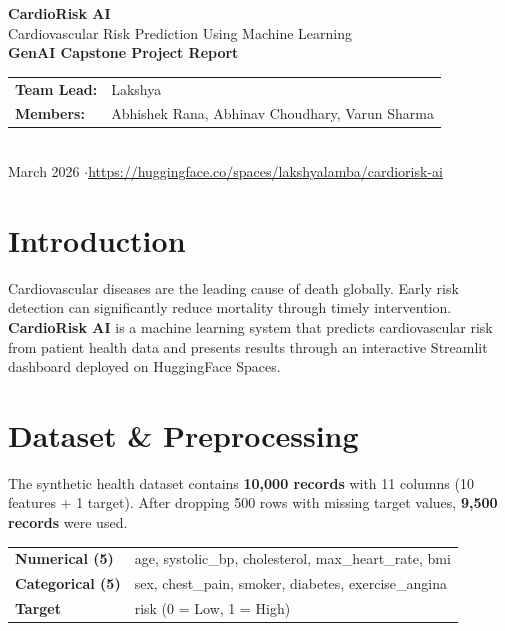 \documentclass[12pt, a4paper]{article}
\begin{document}
\begin{center}
    {\LARGE\bfseries\color{primary} CardioRisk AI}\\[4pt]
    {\large Cardiovascular Risk Prediction Using Machine Learning}\\[12pt]
    \textbf{GenAI Capstone Project Report}\\[16pt]
    \begin{tabular}{ll}
        \textbf{Team Lead:} & Lakshya \\
        \textbf{Members:}   & Abhishek Rana, Abhinav Choudhary, Varun Sharma \\
    \end{tabular}\\[8pt]
    {\color{graytext} March 2026 \quad$\cdot$\quad \url{https://huggingface.co/spaces/lakshyalamba/cardiorisk-ai}}
\end{center}

\vspace{6pt}

\section{Introduction}
Cardiovascular diseases are the leading cause of death globally. Early risk detection can significantly reduce mortality through timely intervention. \textbf{CardioRisk AI} is a machine learning system that predicts cardiovascular risk from patient health data and presents results through an interactive Streamlit dashboard deployed on HuggingFace Spaces.

\section{Dataset \& Preprocessing}
The synthetic health dataset contains \textbf{10,000 records} with 11 columns (10 features + 1 target). After dropping 500 rows with missing target values, \textbf{9,500 records} were used.

\begin{table}[H]
\centering\small
\begin{tabular}{ll}
\toprule
\textbf{Numerical (5)} & age, systolic\_bp, cholesterol, max\_heart\_rate, bmi \\
\textbf{Categorical (5)} & sex, chest\_pain, smoker, diabetes, exercise\_angina \\
\textbf{Target} & risk (0 = Low, 1 = High) \\
\bottomrule
\end{tabular}
\end{table}
\end{document}
